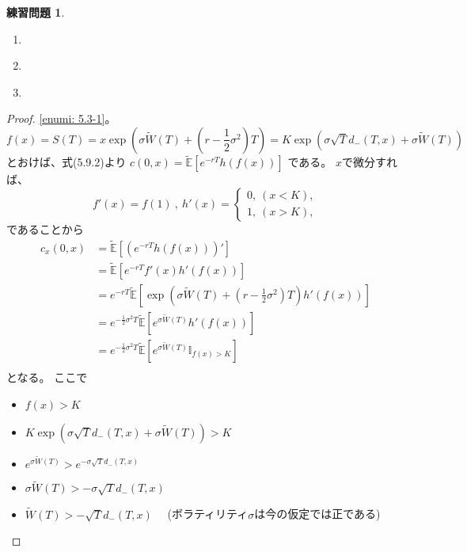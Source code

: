 \documentclass[uplatex]{jsarticle}
\theoremstyle{definition}
\newtheorem{prob}[prob]{練習問題}
\def\E{\mathbb{E}}
\def\I{\mathbb{I}}
\begin{document}
\begin{prob}\label{prob: 5.3}
  \begin{enumerate}
    \item \label{enumi: 5.3-1}
    \item \label{enumi: 5.3-2}
    \item \label{enumi: 5.3-3}
  \end{enumerate}
\end{prob}

\begin{proof}
  \ref{enumi: 5.3-1}。
  \[
  f(x)
  = S(T) = x\exp \left( \sigma\tilde{W}(T)
  + \left( r-\frac{1}{2}\sigma^2\right) T\right)
  = K\exp \left(\sigma \sqrt{T} d_-(T,x) + \sigma \tilde{W}(T)\right)
  \]
  とおけば、式(5.9.2)より
  \(c(0,x) = \tilde{\E}\left[ e^{-rT}h(f(x))\right]\)
  である。
  \(x\)で微分すれば、
  \[
  f'(x) = f(1) \ , \
  h'(x) =
  \begin{cases}
    0, \ (x < K), \\
    1, \ (x > K),
  \end{cases}
  \]
  であることから
  \begin{align*}
    c_x(0,x) &= \tilde{\E}\left[ \left( e^{-rT}h(f(x))\right) '\right] \\
    &= \tilde{\E}\left[ e^{-rT}f'(x)h'(f(x)) \right] \\
    &= e^{-rT}\tilde{\E}\left[
    \exp \left( \sigma\tilde{W}(T)
    + \left( r-\frac{1}{2}\sigma^2\right) T\right)h'(f(x))
    \right] \\
    &= e^{-\frac{1}{2}\sigma^2T} \tilde{\E}\left[
    e^{\sigma\tilde{W}(T)} h'(f(x)) \right] \\
    &= e^{-\frac{1}{2}\sigma^2T} \tilde{\E}\left[
    e^{\sigma\tilde{W}(T)} \I_{f(x) > K} \right] \\
  \end{align*}
  となる。
  ここで
  \begin{itemize}
    \item[ \ ] \(f(x) > K\)
    \item[\(\iff\)]
    \(K\exp \left(\sigma \sqrt{T} d_-(T,x) + \sigma \tilde{W}(T)\right) > K\)
    \item[\(\iff\)]
    \(e^{\sigma \tilde{W}(T)} > e^{-\sigma \sqrt{T} d_-(T,x)}\)
    \item[\(\iff\)]
    \(\sigma \tilde{W}(T) > - \sigma \sqrt{T} d_-(T,x)\)
    \item[\(\iff\)]
    \( \tilde{W}(T) > - \sqrt{T} d_-(T,x)\)
    \ \ (ボラティリティ\(\sigma\)は今の仮定では正である)
  \end{itemize}

\end{proof}
\end{document}
